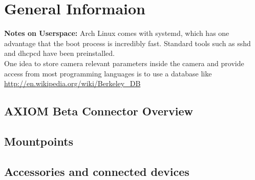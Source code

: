 \section{General Informaion}


\textbf{Notes on Userspace:} Arch Linux comes with systemd, which has one advantage that the boot process is incredibly fast. Standard tools such as sshd and dhcpcd have been preinstalled.\\

One idea to store camera relevant parameters inside the camera and provide access from most programming languages is to use a database like \href{http://en.wikipedia.org/wiki/Berkeley_DB}{http://en.wikipedia.org/wiki/Berkeley\_DB}


\subsection{AXIOM Beta Connector Overview}
	\subsection{Mountpoints}
	\subsection{Accessories and connected devices}
	
